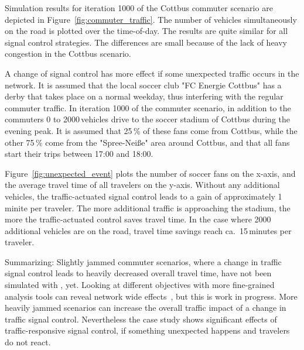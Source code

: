 Simulation results for iteration 1000 of the Cottbus commuter scenario are depicted in Figure~\ref{fig:commuter_traffic}. The number of vehicles simultaneously on the road is plotted over the time-of-day. The results are quite similar for all signal control strategies. The differences are small because of the lack of heavy congestion in the Cottbus scenario. 

A change of signal control has more effect if some unexpected traffic occurs in the network. It is assumed that the local soccer club "FC Energie Cottbus" has a derby that takes place on a normal weekday, thus interfering with the regular commuter traffic. In iteration 1000 of the commuter scenario, in addition to the commuters 0 to 2000\,vehicles drive to the soccer stadium of Cottbus during the evening peak. It is assumed that 25\,\% of these fans come from Cottbus, while the other 75\,\% come from the "Spree-Nei{\ss}e" area around Cottbus, and that all fans start their trips between 17:00 and 18:00. 

Figure~\ref{fig:unexpected_event} plots the number of soccer fans on the x-axis, and the average travel time of all travelers on the y-axis. Without any additional vehicles, the traffic-actuated signal control leads to a gain of approximately 1\,minite per traveler. The more additional traffic is approaching the stadium, the more the traffic-actuated control saves travel time. In the case where 2000\,additional vehicles are on the road, travel time savings reach ca.~15\,minutes per traveler. 

Summarizing: Slightly jammed commuter scenarios, where a change in traffic signal control leads to heavily decreased overall travel time, have not been simulated with , yet. Looking at different objectives with more fine-grained analysis tools can reveal network wide effects~\citep[e.g.,\,see the analysis using macroscopic fundamental diagrams][pp.114]{Grether2014PhD}, but this is work in progress. More heavily jammed scenarios can increase the overall traffic impact of a change in traffic signal control. Nevertheless the case study shows significant effects of traffic-responsive signal control, if something unexpected happens and travelers do not react.  

